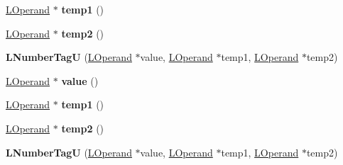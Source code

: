 \begin{DoxyCompactItemize}
\item 
\hyperlink{classv8_1_1internal_1_1_l_operand}{L\+Operand} $\ast$ {\bfseries temp1} ()\hypertarget{classv8_1_1internal_1_1_l_number_tag_u_af1b9a9050ae593071ec641d8db810594}{}\label{classv8_1_1internal_1_1_l_number_tag_u_af1b9a9050ae593071ec641d8db810594}

\item 
\hyperlink{classv8_1_1internal_1_1_l_operand}{L\+Operand} $\ast$ {\bfseries temp2} ()\hypertarget{classv8_1_1internal_1_1_l_number_tag_u_afac0fd287b623c724001aee50155b71c}{}\label{classv8_1_1internal_1_1_l_number_tag_u_afac0fd287b623c724001aee50155b71c}

\item 
{\bfseries L\+Number\+TagU} (\hyperlink{classv8_1_1internal_1_1_l_operand}{L\+Operand} $\ast$value, \hyperlink{classv8_1_1internal_1_1_l_operand}{L\+Operand} $\ast$temp1, \hyperlink{classv8_1_1internal_1_1_l_operand}{L\+Operand} $\ast$temp2)\hypertarget{classv8_1_1internal_1_1_l_number_tag_u_a29c2cbf4352a712caccdaed62fc601d7}{}\label{classv8_1_1internal_1_1_l_number_tag_u_a29c2cbf4352a712caccdaed62fc601d7}

\item 
\hyperlink{classv8_1_1internal_1_1_l_operand}{L\+Operand} $\ast$ {\bfseries value} ()\hypertarget{classv8_1_1internal_1_1_l_number_tag_u_a250600d81f63976f70111c5b90a2a5c3}{}\label{classv8_1_1internal_1_1_l_number_tag_u_a250600d81f63976f70111c5b90a2a5c3}

\item 
\hyperlink{classv8_1_1internal_1_1_l_operand}{L\+Operand} $\ast$ {\bfseries temp1} ()\hypertarget{classv8_1_1internal_1_1_l_number_tag_u_af1b9a9050ae593071ec641d8db810594}{}\label{classv8_1_1internal_1_1_l_number_tag_u_af1b9a9050ae593071ec641d8db810594}

\item 
\hyperlink{classv8_1_1internal_1_1_l_operand}{L\+Operand} $\ast$ {\bfseries temp2} ()\hypertarget{classv8_1_1internal_1_1_l_number_tag_u_afac0fd287b623c724001aee50155b71c}{}\label{classv8_1_1internal_1_1_l_number_tag_u_afac0fd287b623c724001aee50155b71c}

\item 
{\bfseries L\+Number\+TagU} (\hyperlink{classv8_1_1internal_1_1_l_operand}{L\+Operand} $\ast$value, \hyperlink{classv8_1_1internal_1_1_l_operand}{L\+Operand} $\ast$temp1, \hyperlink{classv8_1_1internal_1_1_l_operand}{L\+Operand} $\ast$temp2)\hypertarget{classv8_1_1internal_1_1_l_number_tag_u_a29c2cbf4352a712caccdaed62fc601d7}{}\label{classv8_1_1internal_1_1_l_number_tag_u_a29c2cbf4352a712caccdaed62fc601d7}


\end{DoxyCompactItemize}

